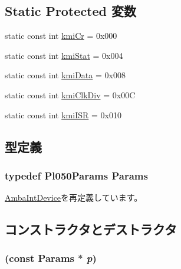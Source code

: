 \subsection*{Static Protected 変数}
\begin{DoxyCompactItemize}
\item 
static const int \hyperlink{classPl050_a94aa9060c3488d5cdfb2dd78c874d207}{kmiCr} = 0x000
\item 
static const int \hyperlink{classPl050_abe6bafc131e2ec278a0a4c467bd7648a}{kmiStat} = 0x004
\item 
static const int \hyperlink{classPl050_ae09c83c7501da90dbfd234377912503a}{kmiData} = 0x008
\item 
static const int \hyperlink{classPl050_a4199383ce9d3a94925b34a565f984079}{kmiClkDiv} = 0x00C
\item 
static const int \hyperlink{classPl050_ad616dc94a2b0aa2585e72dbf0e98cdd9}{kmiISR} = 0x010
\end{DoxyCompactItemize}


\subsection{型定義}
\hypertarget{classPl050_a12cd0d18c639c998ce04efabfca4d619}{
\subsubsection[{Params}]{\setlength{\rightskip}{0pt plus 5cm}typedef Pl050Params {\bf Params}}}
\label{classPl050_a12cd0d18c639c998ce04efabfca4d619}


\hyperlink{classAmbaIntDevice_aa70660260d212b343768d91a298c80de}{AmbaIntDevice}を再定義しています。

\subsection{コンストラクタとデストラクタ}
\hypertarget{classPl050_aee46f95854b38b40deb83122bffdde55}{
\subsubsection[{Pl050}]{ (const {\bf Params} $\ast$ {\em p})}}
\label{classPl050_aee46f95854b38b40deb83122bffdde55}



